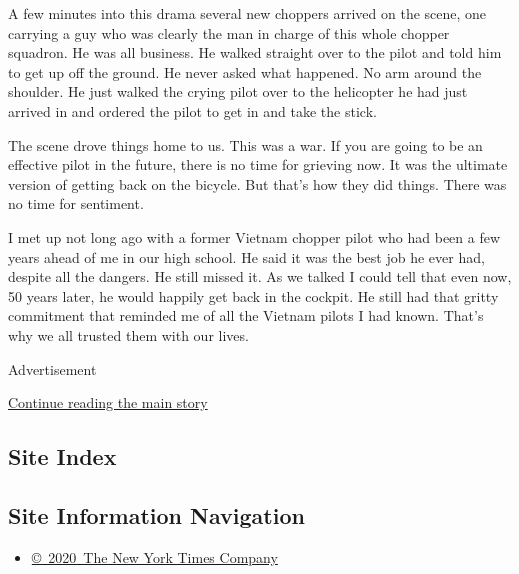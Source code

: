 A few minutes into this drama several new choppers arrived on the scene,
one carrying a guy who was clearly the man in charge of this whole
chopper squadron. He was all business. He walked straight over to the
pilot and told him to get up off the ground. He never asked what
happened. No arm around the shoulder. He just walked the crying pilot
over to the helicopter he had just arrived in and ordered the pilot to
get in and take the stick.

The scene drove things home to us. This was a war. If you are going to
be an effective pilot in the future, there is no time for grieving now.
It was the ultimate version of getting back on the bicycle. But that's
how they did things. There was no time for sentiment.

I met up not long ago with a former Vietnam chopper pilot who had been a
few years ahead of me in our high school. He said it was the best job he
ever had, despite all the dangers. He still missed it. As we talked I
could tell that even now, 50 years later, he would happily get back in
the cockpit. He still had that gritty commitment that reminded me of all
the Vietnam pilots I had known. That's why we all trusted them with our
lives.

Advertisement

\protect\hyperlink{after-bottom}{Continue reading the main story}

\hypertarget{site-index}{%
\subsection{Site Index}\label{site-index}}

\hypertarget{site-information-navigation}{%
\subsection{Site Information
Navigation}\label{site-information-navigation}}

\begin{itemize}
\tightlist
\item
  \href{https://help.nytimes.com/hc/en-us/articles/115014792127-Copyright-notice}{©~2020~The
  New York Times Company}
\end{itemize}

